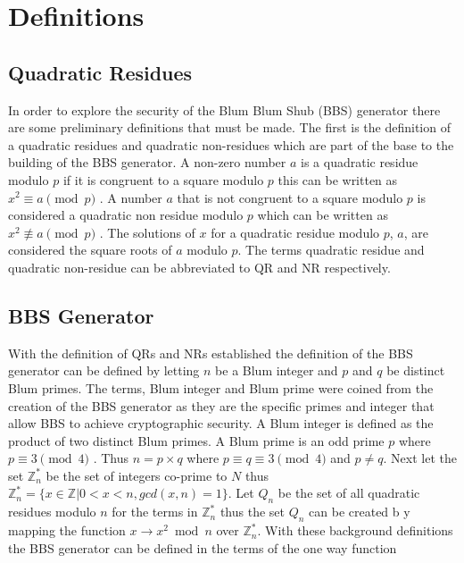 \documentclass{article}
\begin{document}
\section{Definitions}

\subsection{Quadratic Residues}

In order to explore the security of the Blum Blum Shub (BBS) generator there are some preliminary definitions that must be made. The first is the definition of a quadratic residues and quadratic non-residues which are part of the base to the building of the BBS generator. A non-zero number $a$ is a quadratic residue modulo $p$ if it is congruent to a square modulo $p$ this can be written as $x^2 \equiv a \pmod{p}$ \cite{Silverman2006}. A number $a$ that is not congruent to a square modulo $p$ is considered a quadratic non residue modulo $p$ which can be written as $x^2 \not\equiv a \pmod{p}$ \cite{Silverman2006}. The solutions of $x$ for a quadratic residue modulo $p$, $a$, are considered the square roots of $a$ modulo $p$. The terms quadratic residue and quadratic non-residue can be abbreviated to QR and NR respectively.

\subsection{BBS Generator}

With the definition of QRs and NRs established the definition of the BBS generator can be defined by letting $n$ be a Blum integer and $p$ and $q$ be distinct Blum primes. The terms, Blum integer and Blum prime were coined from the creation of the BBS generator as they are the specific primes and integer that allow BBS to achieve cryptographic security. A Blum integer is defined as the product of two distinct Blum primes. A Blum prime is an odd prime $p$ where $p \equiv 3 \pmod{4}$ \cite{Pardo2012}. Thus $n = p \times q$ where $p \equiv q \equiv 3 \pmod{4}$ and $p \not= q$. Next let the set $\mathbb{Z}_n^*$ be the set of integers co-prime to $N$ thus $\mathbb{Z}_n^* = \{ x \in \mathbb{Z}| 0 < x < n, \mathit{gcd}(x,n) = 1 \}$. Let $Q_n$ be the set of all quadratic residues modulo $n$ for the terms in $\mathbb{Z}_n^*$ thus the set $Q_n$ can be created b y mapping the function $x \to x^2 \bmod n$ over $\mathbb{Z}_n^*$. With these background definitions the BBS generator can be defined in the terms of the one way function
\end{document}
